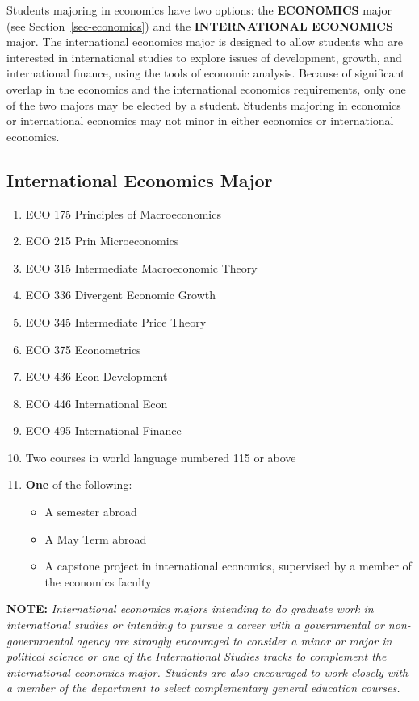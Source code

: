 \documentclass[
  letterpaper,
]{scrbook}
\providecommand{\tightlist}{%
  \setlength{\itemsep}{0pt}\setlength{\parskip}{0pt}}
\begin{document}
Students majoring in economics have two options: the \textbf{ECONOMICS}
major (see Section~\ref{sec-economics}) and the \textbf{INTERNATIONAL
ECONOMICS} major. The international economics major is designed to allow
students who are interested in international studies to explore issues
of development, growth, and international finance, using the tools of
economic analysis. Because of significant overlap in the economics and
the international economics requirements, only one of the two majors may
be elected by a student. Students majoring in economics or international
economics may not minor in either economics or international economics.

\subsection{International Economics
Major}\label{international-economics-major}

\begin{enumerate}
\def\labelenumi{\arabic{enumi}.}
\tightlist
\item
  ECO 175 Principles of Macroeconomics
\item
  ECO 215 Prin Microeconomics
\item
  ECO 315 Intermediate Macroeconomic Theory
\item
  ECO 336 Divergent Economic Growth
\item
  ECO 345 Intermediate Price Theory
\item
  ECO 375 Econometrics
\item
  ECO 436 Econ Development
\item
  ECO 446 International Econ
\item
  ECO 495 International Finance
\item
  Two courses in world language numbered 115 or above
\item
  \textbf{One} of the following:

  \begin{itemize}
  \tightlist
  \item
    A semester abroad
  \item
    A May Term abroad
  \item
    A capstone project in international economics, supervised by a
    member of the economics faculty
  \end{itemize}
\end{enumerate}

\textbf{NOTE:} \emph{International economics majors intending to do
graduate work in international studies or intending to pursue a career
with a governmental or non-governmental agency are strongly encouraged
to consider a minor or major in political science or one of the
International Studies tracks to complement the international economics
major. Students are also encouraged to work closely with a member of the
department to select complementary general education courses. }
\end{document}
